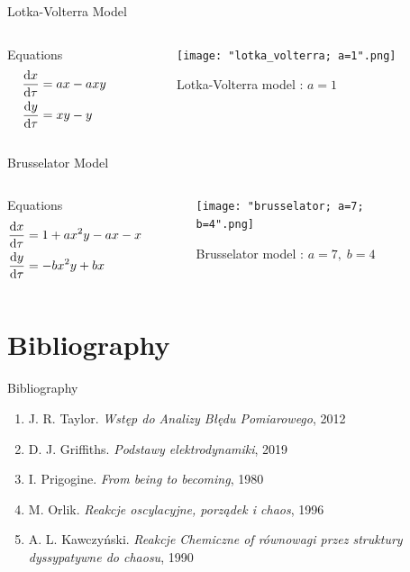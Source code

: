 \documentclass[xcolor]{beamer}
\begin{document}
\begin{frame}{Lotka-Volterra Model}
\begin{columns}
\begin{column}{0.4\textwidth}
\begin{block}{Equations}
\begin{align*}
\odv{x}{\tau} &= ax - axy \\
\odv{y}{\tau} &= xy - y
\end{align*}
\end{block}
\end{column}

\begin{column}{0.6\textwidth}
\begin{figure}[H]
\centering
\texttt{[image: "lotka\_volterra; a=1".png]}
\caption{Lotka-Volterra model  : \(a=1\)}
\end{figure}
\end{column}
\end{columns}
\end{frame}

\begin{frame}{Brusselator Model}
\begin{columns}
\begin{column}{0.4\textwidth}
\begin{block}{Equations}
\begin{align*}
\odv{x}{\tau} &= 1 + ax^{2}y - ax - x \\
\odv{y}{\tau} &= -bx^{2}y + bx
\end{align*}
\end{block}
\end{column}

\begin{column}{0.6\textwidth}
\begin{figure}[H]
\centering
\texttt{[image: "brusselator; a=7; b=4".png]}
\caption{Brusselator model  : \(a=7, \; b=4\)}
\end{figure}
\end{column}
\end{columns}
\end{frame}

\section{Bibliography}
\begin{frame}{Bibliography}
\begin{enumerate}
\item J. R. Taylor. \emph{Wstęp do Analizy Błędu Pomiarowego}, 2012
\item D. J. Griffiths. \emph{Podstawy elektrodynamiki}, 2019
\item I. Prigogine. \emph{From being to becoming}, 1980
\item M. Orlik. \emph{Reakcje oscylacyjne, porządek i chaos}, 1996
\item A. L. Kawczyński. \emph{Reakcje Chemiczne of równowagi przez struktury dyssypatywne do chaosu}, 1990
\end{enumerate}
\end{frame}
\end{document}
